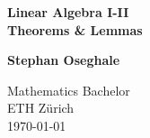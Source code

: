 \begin{titlepage}
	\begin{center}
		\vspace*{1cm}
		\HRule{0.5pt}
		\Huge
		\textbf{Linear Algebra I-II}\\
		\textbf{Theorems \& Lemmas}
		
		\vspace{0.5cm}
		\LARGE
		\HRule{2pt}
		\vspace{1.5cm}
		
		\Large
		\textbf{Stephan Oseghale}
		
		\vfill
		
		\large
		
		
		\vspace{0.8cm}
		
		
		\normalsize
		Mathematics Bachelor\\
		ETH Zürich\\
		\today
		
	\end{center}
\end{titlepage}
